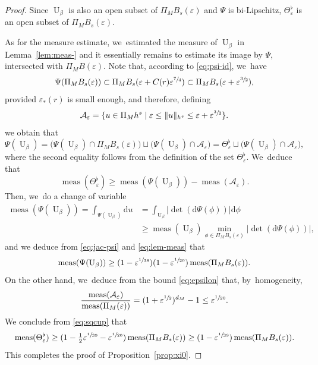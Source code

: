 \documentclass[JEP,XML,SOM,Unicode,published]{cedram}
\theoremstyle{plain}
\theoremstyle{definition}
\DeclareMathOperator{\meas}{meas}
\newcommand{\1}{\mathbf{1}}
\let\epsilon\varepsilon
\begin{document}
\begin{proof}
Since $\operatorname{U}_{\beta}$ is also an open subset of $\Pi_{M}B_{s}(\epsilon)$ and $\Psi$ is bi-Lipschitz, $\Theta_{\epsilon}^{\flat}$ is an open subset of $\Pi_{M}B_{s}(\epsilon)$.

As for the measure estimate, we~estimated the measure of $\operatorname{U}_{\beta}$ in Lemma~\ref{lem:meas-} and it essentially remains to estimate its image by $\Psi$, intersected with $\Pi_{M}B(\epsilon)$.
Note that, according to \eqref{eq:psi-id}, we~have
\[
\Psi(\Pi_{M}B_{s}(\epsilon))\subset \Pi_{M}B_{s}(\epsilon+C(r)\epsilon^{\sfrac{7}{4}})
\subset \Pi_{M}B_{s}(\epsilon+\epsilon^{\sfrac{3}{2}}),
\]
provided $\epsilon_{\ast}(r)$ is small enough, and therefore, defining
\[
\mathcal{A}_{\epsilon} = \{ u\in \Pi_{M}h^{s}\mid \epsilon \leq \|u\|_{h^{s}} \leq \epsilon + \epsilon^{\sfrac{3}{2}}\}.
\]
we obtain that
\[
\Psi(\operatorname{U}_{\beta})
=
\big(
\Psi(\operatorname{U}_{\beta})
\cap
\Pi_{M}B_{s}(\epsilon)
\big)
\sqcup
\big(
\Psi(\operatorname{U}_{\beta})\cap \mathcal{A}_{\epsilon}
\big)
= \Theta_{\epsilon}^{\flat}
\sqcup
\big(
\Psi(\operatorname{U}_{\beta})\cap \mathcal{A}_{\epsilon}
\big),
\]
where the second equality follows from the definition of the set $\Theta_{\epsilon}^{\flat}$. We~deduce that
\begin{equation}
\label{eq:sqcup}
\meas(\Theta_{\epsilon}^{\flat})
\geq
\meas(\Psi(\operatorname{U}_{\beta}))
- \meas(\mathcal{A}_{\epsilon}).
\end{equation}
Then, we~do a change of variable
\[
\begin{split}
\meas(\Psi(\operatorname{U}_{\beta}))
=
\int_{\Psi(\operatorname{U}_{\beta})}
\mathrm{d}u
&=
\int_{\operatorname{U}_{\beta}}
|{\det(\mathrm{d}\Psi(\phi))}|\mathrm{d}\phi \\
&\geq
\meas(\operatorname{U}_{\beta})
\min_{\phi\in \Pi_{M}B_s(\epsilon)}
|{\det(\mathrm{d}\Psi(\phi))}|,
\end{split}
\]
and we deduce from \eqref{eq:jac-psi} and \eqref{eq:lem-meas} that
\[
\meas
(
\Psi(\operatorname{U}_{\beta})
)
\geq
(1-\epsilon^{\sfrac{1}{38}})(1-\epsilon^{\sfrac{1}{20}})\meas(\Pi_{M}B_s(\epsilon)).
\]
On the other hand, we~deduce from the bound \eqref{eq:epsilon} that, by~homogeneity,
\[
\frac{\meas(\mathcal{A}_{\epsilon})}
{\meas(\Pi_{M}(\epsilon))}
=
(1+\epsilon^{\sfrac{1}{2}})^{d_{M}}
-1
\leq \epsilon^{\sfrac{1}{20}}.
\]
We conclude from \eqref{eq:sqcup} that
\[
\meas(\Theta_{\epsilon}^{\flat}) \geq (1-\tfrac{1}{2}\epsilon^{\sfrac{1}{39}}- \epsilon^{\sfrac{1}{20}})\meas(\Pi_{M}B_{s}(\epsilon)) \geq (1-\epsilon^{\sfrac{1}{39}})\meas(\Pi_{M}B_{s}(\epsilon)).
\]
This completes the proof of Proposition~\ref{prop:xi0}.
\end{proof}
\end{document}
